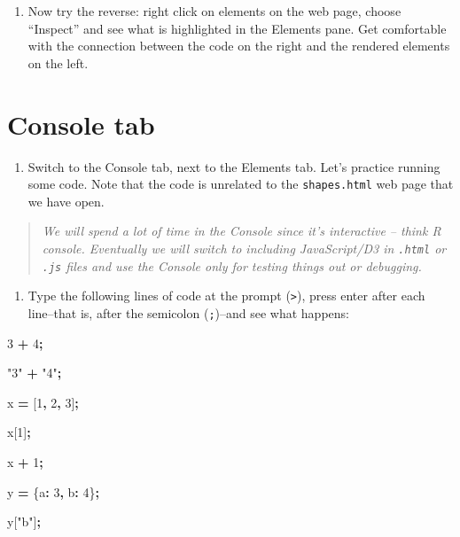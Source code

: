 \documentclass[
  openany]{book}
\newenvironment{Shaded}{\begin{snugshade}}{\end{snugshade}}
\newcommand{\DataTypeTok}[1]{\textcolor[rgb]{0.13,0.29,0.53}{#1}}
\newcommand{\DecValTok}[1]{\textcolor[rgb]{0.00,0.00,0.81}{#1}}
\newcommand{\NormalTok}[1]{#1}
\newcommand{\OperatorTok}[1]{\textcolor[rgb]{0.81,0.36,0.00}{\textbf{#1}}}
\newcommand{\StringTok}[1]{\textcolor[rgb]{0.31,0.60,0.02}{#1}}
\providecommand{\tightlist}{%
  \setlength{\itemsep}{0pt}\setlength{\parskip}{0pt}}
\begin{document}
\begin{enumerate}
\def\labelenumi{\arabic{enumi}.}
\setcounter{enumi}{2}
\tightlist
\item
  Now try the reverse: right click on elements on the web page, choose ``Inspect'' and see what is highlighted in the Elements pane. Get comfortable with the connection between the code on the right and the rendered elements on the left.
\end{enumerate}

\hypertarget{console-tab}{%
\section{\texorpdfstring{Console tab }{Console tab }}\label{console-tab}}

\begin{enumerate}
\def\labelenumi{\arabic{enumi}.}
\tightlist
\item
  Switch to the Console tab, next to the Elements tab. Let's practice running some code. Note that the code is unrelated to the \texttt{shapes.html} web page that we have open.
\end{enumerate}

\begin{quote}
\emph{We will spend a lot of time in the Console since it's interactive -- think R console. Eventually we will switch to including JavaScript/D3 in \texttt{.html} or \texttt{.js} files and use the Console only for testing things out or debugging.}
\end{quote}

\begin{enumerate}
\def\labelenumi{\arabic{enumi}.}
\setcounter{enumi}{1}
\tightlist
\item
  Type the following lines of code at the prompt (\texttt{\textgreater{}}), press enter after each line--that is, after the semicolon (\texttt{;})--and see what happens:
\end{enumerate}

\begin{Shaded}
\begin{Highlighting}[]
\DecValTok{3} \OperatorTok{+} \DecValTok{4}\OperatorTok{;}
    
\StringTok{"3"} \OperatorTok{+} \StringTok{"4"}\OperatorTok{;}

\NormalTok{ x }\OperatorTok{=}\NormalTok{ [}\DecValTok{1}\OperatorTok{,} \DecValTok{2}\OperatorTok{,} \DecValTok{3}\NormalTok{]}\OperatorTok{;}
    
\NormalTok{x[}\DecValTok{1}\NormalTok{]}\OperatorTok{;}
    
\NormalTok{x }\OperatorTok{+} \DecValTok{1}\OperatorTok{;}
    
\NormalTok{y }\OperatorTok{=}\NormalTok{ \{}\DataTypeTok{a}\OperatorTok{:} \DecValTok{3}\OperatorTok{,} \DataTypeTok{b}\OperatorTok{:} \DecValTok{4}\NormalTok{\}}\OperatorTok{;}
    
\NormalTok{y[}\StringTok{"b"}\NormalTok{]}\OperatorTok{;}
\end{Highlighting}
\end{Shaded}
\end{document}
